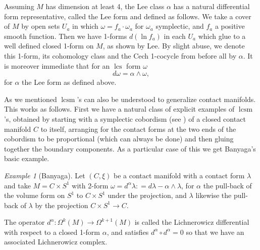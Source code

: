 \documentclass{amsart}
\numberwithin{equation}{section}
\theoremstyle{definition}
\theoremstyle{remark}
\newtheorem{example}{Example}
\DeclareMathOperator{\lcs}{lcs}
\DeclareMathOperator{\lcsm}{lcsm}
\begin{document}
Assuming $M$ has dimension at least 4, the Lee class $\alpha$ has a natural differential form representative, called the Lee form and defined as follows.  We take a cover of $M$ by open sets $U _{a} $ in which $\omega= f _{a} \cdot \omega _{a}   $ for $\omega _{a}  $ symplectic, and $f _{a} $ a positive smooth function.
   Then we have 1-forms $d (\ln f _{a} )$ in each $U _{a} $ which glue to a well defined closed 1-form on $M$, as shown by Lee. By slight abuse, we denote this 1-form, its cohomology class and the Cech 1-cocycle from before all by $\alpha$.
It is moreover immediate that for an $\lcs$ form $\omega$ $$d\omega= \alpha \wedge \omega,$$
for $\alpha$ the Lee form as defined above.

As we mentioned $\lcsm$'s can also be understood to generalize contact manifolds. This works as follows.
First we have a natural class of explicit examples of $\lcsm$'s, obtained
by starting with a symplectic cobordism (see \cite{citeEliashbergMurphyMakingcobordisms}) of a closed contact manifold
$C$ to itself, arranging for the contact forms at the two ends of the
cobordism to be proportional (which can always be done) and then
gluing together the boundary components. 
As a particular case of
this we get Banyaga's basic example.
\begin{example} [Banyaga] \label{example:banyaga} Let $(C, \xi)
   $ be a contact manifold with a contact form
   $\lambda$ and take $M=C \times S ^{1}  $ with 2-form $\omega= d
^{\alpha} 
   \lambda : = d \lambda - \alpha \wedge \lambda$, for $\alpha$ the pull-back of the
   volume form on $S ^{1} $ to $C \times S ^{1} $ under the
   projection, and $\lambda$ likewise the pull-back of $\lambda$ by the projection $C \times S ^{1} \to C $.
\end{example}
The operator $d ^{\alpha}: \Omega ^{k} (M) \to \Omega ^{k+1} (M)   $ is called the Lichnerowicz differential with respect to a closed 1-form $\alpha$,
and satisfies $d ^{\alpha} \circ d ^{\alpha} =0  $ so that we have an associated Lichnerowicz complex.
\end{document}
